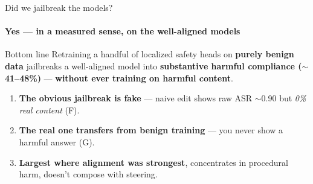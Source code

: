 \documentclass[aspectratio=169]{beamer}
\newcommand{\hl}[1]{\textcolor{themeblue}{\textbf{#1}}}
\begin{document}
\begin{frame}{Did we jailbreak the models?}
  \framesubtitle{Yes --- in a measured sense, on the well-aligned models}
  \begin{block}{Bottom line}
    Retraining a handful of localized safety heads on \hl{purely benign data} jailbreaks a well-aligned model into \hl{substantive harmful compliance ($\sim$41--48\%)} --- \hl{without ever training on harmful content}.
  \end{block}
  \vspace{3pt}
  \begin{enumerate}\footnotesize
    \item \hl{The obvious jailbreak is fake} --- naive edit shows raw ASR $\sim$0.90 but \emph{0\% real content} (F).
    \item \hl{The real one transfers from benign training} --- you never show a harmful answer (G).
    \item \hl{Largest where alignment was strongest}, concentrates in procedural harm, doesn't compose with steering.
  \end{enumerate}
\end{frame}
\end{document}
